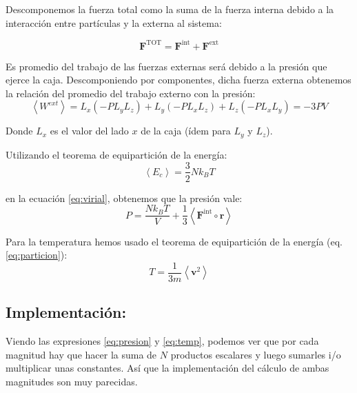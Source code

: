 \documentclass[onecolumn]{article}
\renewcommand{\vec}[1]{\mathbf{#1}}
\begin{document}
Descomponemos la fuerza total como la suma de la fuerza interna debido a la interacción entre partículas y la externa al sistema:

\begin{equation}
\vec{F}^{\text{TOT}} = \vec{F}^{\text{int}}+\vec{F}^{\text{ext}}
\end{equation}

Es promedio del trabajo de las fuerzas externas será debido a la presión que ejerce la caja. Descomponiendo por componentes, dicha fuerza externa obtenemos la relación del promedio del trabajo externo con la presión:
\begin{equation}
\left\langle W^{ext}	\right\rangle = L_x (-PL_yL_z)+L_y (-PL_xL_z)+L_z (-PL_xL_y)= -3PV
\end{equation}

Donde $L_x$ es el valor del lado $x$ de la caja (ídem para $L_y$ y $L_z$).

Utilizando el teorema de equipartición de la energía:
\begin{equation}
\left\langle E_c \right\rangle= \frac{3}{2} N k_B T
\label{eq:particion}
\end{equation}

en la ecuación \ref{eq:virial}, obtenemos que la presión vale:
\begin{equation}
P = \frac{Nk_BT}{V}+\frac{1}{3}\left\langle \vec{F}^{\text{int}} \circ \vec{r} \right\rangle
\label{eq:presion}
\end{equation}

Para la temperatura hemos usado el teorema de equipartición de la energía (eq. \ref{eq:particion}):
\begin{equation}
T = \frac{1}{3m} \left\langle \vec{v}^2 \right\rangle
\label{eq:temp}
\end{equation}

\subsection{Implementación:}
Viendo las expresiones \ref{eq:presion} y \ref{eq:temp}, podemos ver que por cada magnitud hay que hacer la suma de $N$ productos escalares y luego sumarles i/o multiplicar unas constantes. Así que la implementación del cálculo de ambas magnitudes son muy parecidas.
\end{document}
